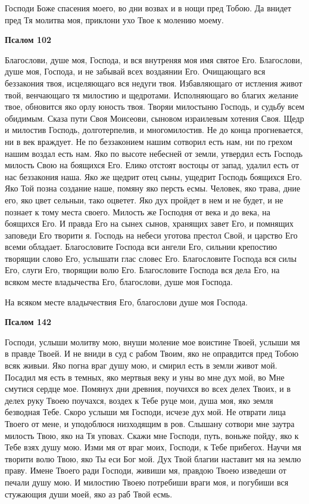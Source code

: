    Господи Боже спасения моего, во дни возвах и в нощи пред Тобою. Да
внидет пред Тя молитва моя, приклони ухо Твое к молению моему.






 

\bfseries Псалом 102\normalfont{}


   Благослови, душе моя, Господа, и вся внутреняя моя имя святое Его.
Благослови, душе моя, Господа, и не забывай всех воздаянии Его.
Очищающаго вся беззакония твоя, исцеляющаго вся недуги твоя.
Избавляющаго от истления живот твой, венчающаго тя милостию и
щедротами. Исполняющаго во благих желание твое, обновится яко орлу
юность твоя. Творяи милостыню Господь, и судьбу всем обидимым. Сказа
пути Своя Моисеови, сыновом израилевым хотения Своя. Щедр и милостив
Господь, долготерпелив, и многомилостив. Не до конца прогневается, ни в
век враждует. Не по беззаконием нашим сотворил есть нам, ни по грехом
нашим воздал есть нам. Яко по высоте небесней от земли, утвердил есть
Господь милость Свою на боящихся Его. Елико отстоят востоцы от запад,
удалил есть от нас беззакония наша. Яко же щедрит отец сыны, ущедрит
Господь боящихся Его. Яко Той позна создание наше, помяну яко персть
есмы. Человек, яко трава, дние его, яко цвет сельныи, тако оцветет.
Яко дух пройдет в нем и не будет, и не познает к тому места своего.
Милость же Господня от века и до века, на боящихся Его. И правда
Его на сынех сынов, хранящих завет Его, и помнящих заповеди Его
творити я. Господь на небеси уготова престол Свой, и царство Его всеми
обладает. Благословите Господа вси ангели Его, сильнии крепостию
творящии слово Его, услышати глас словес Его. Благословите Господа вся
силы Его, слуги Его, творящии волю Его. Благословите Господа вся
дела Его, на всяком месте владычества Его, благослови, душе моя
Господа.


   На всяком месте владычествия Его, благослови душе моя Господа.






 

\bfseries Псалом 142\normalfont{}


   Господи, услыши молитву мою, внуши моление мое воистине Твоей,
услыши мя в правде Твоей. И не вниди в суд с рабом Твоим, яко не
оправдится пред Тобою всяк живыи. Яко погна враг душу мою, и смирил
есть в земли живот мой. Посадил мя есть в темных, яко мертвыя веку и уны
во мне дух мой, во Мне смутися сердце мое. Помянух дни древния, поучихся
во всех делех Твоих, и в делех руку Твоею поучахся, воздех к Тебе
руце мои, душа моя, яко земля безводная Тебе. Скоро услыши мя
Господи, исчезе дух мой. Не отврати лица Твоего от мене, и уподоблюся
низходящим в ров. Слышану сотвори мне заутра милость Твою, яко на Тя
уповах. Скажи мне Господи, путь, воньже пойду, яко к Тебе взях душу
мою. Изми мя от враг моих, Господи, к Тебе прибегох. Научи мя
творити волю Твою, яко Ты еси Бог мой. Дух Твой благии наставит мя
на землю праву. Имене Твоего ради Господи, живиши мя, правдою
Твоею изведеши от печали душу мою. И милостию Твоею потребиши
враги моя, и погубиши вся стужающия души моей, яко аз раб Твой
есмь.


